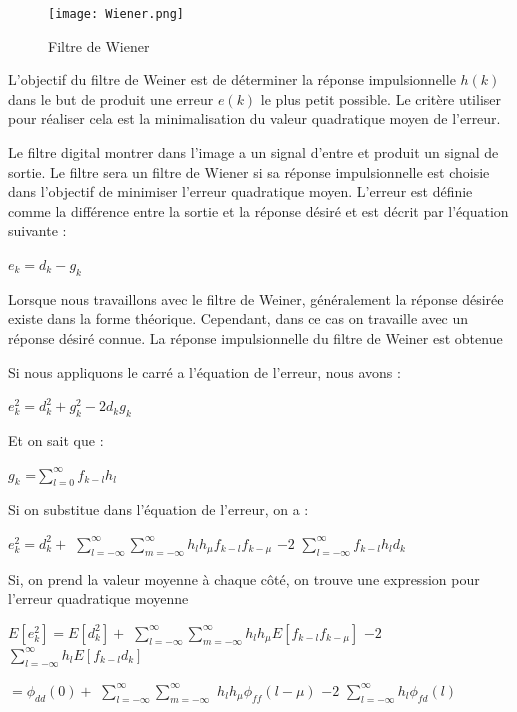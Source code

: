 \documentclass[conference,onecolumn]{IEEEtran}
\begin{document}

\begin{figure}[H]
 \centering
    \texttt{[image: Wiener.png]}
    \caption{Filtre de Wiener}
\end{figure}

L’objectif du filtre de Weiner est de déterminer la réponse impulsionnelle $h(k)$ dans le but de produit une erreur $e(k)$ le plus petit possible. Le critère utiliser pour réaliser cela est la minimalisation du valeur quadratique moyen de l’erreur.

Le filtre digital montrer dans l’image a un signal d’entre et produit un signal de sortie. Le filtre sera un filtre de Wiener si sa réponse impulsionnelle est choisie dans l’objectif de minimiser l’erreur quadratique moyen. L’erreur est définie comme la différence entre la sortie et la réponse désiré et est décrit par l’équation suivante :
\begin{center}
     $e_k=d_k-g_k$
\end{center}{}

Lorsque nous travaillons avec le filtre de Weiner, généralement la réponse désirée existe dans la forme théorique. Cependant, dans ce cas on travaille avec un réponse désiré connue. La réponse impulsionnelle du filtre de Weiner est obtenue 

Si nous appliquons le carré a l’équation de l’erreur, nous avons :

\begin{center}
    $e_k^2=d_k^2+g_k^2-2d_kg_k$
\end{center}{}
    

Et on sait que :

\begin{center}
     $g_k$ =$\displaystyle\sum_{l=0}^{\infty}f_{k-l} h_l $
\end{center}


Si on substitue dans l’équation de l’erreur, on a :

\begin{center}
    $e_k^2=d_k^2+$ $\displaystyle \sum_{l=-\infty}^{\infty}\displaystyle\sum_{m=-\infty}^{\infty}$$h_l h_\mu f_{k-l} f_{k-\mu}$ $- 2$  $\displaystyle\sum_{l= -\infty}^{\infty}f_{k-l} h_l d_k$
\end{center}

Si, on prend la valeur moyenne à chaque côté, on trouve une expression pour l’erreur quadratique moyenne 

\begin{center}
     $E[e_k^2]=E[d_k^2]+$ $\displaystyle \sum_{l=-\infty}^{\infty}\displaystyle\sum_{m=-\infty}^{\infty}$$h_l h_\mu E[f_{k-l} f_{k-\mu}]$ $- 2$  $\displaystyle\sum_{l= -\infty}^{\infty}h_l E[f_{k-l}  d_k]$
\end{center}
\begin{center}
        $= \phi_{dd} (0) + $ $\displaystyle \sum_{l=-\infty}^{\infty}\displaystyle\sum_{m=-\infty}^{\infty}$ $h_l h_\mu \phi_{ff} (l-\mu)$  $- 2$  $\displaystyle\sum_{l= -\infty}^{\infty} h_l \phi_{fd}(l)$
\end{center}
\end{document}
